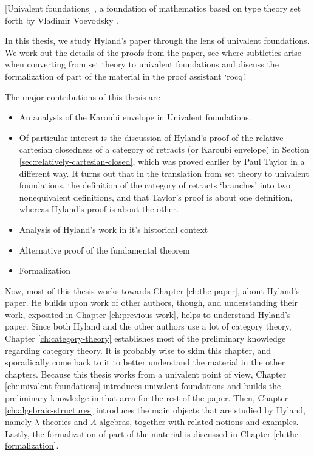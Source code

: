 
[Univalent foundations]
, a foundation of mathematics based on type theory set forth by Vladimir Voevodsky \autocite{voevodsky-univalent-foundations}.

In this thesis, we study Hyland's paper through the lens of univalent foundations. We work out the details of the proofs from the paper, see where subtleties arise when converting from set theory to univalent foundations and discuss the formalization of part of the material in the proof assistant `rocq'.

The major contributions of this thesis are
\begin{itemize}
  \item An analysis of the Karoubi envelope in Univalent foundations.
  \item Of particular interest is the discussion of Hyland's proof of the relative cartesian closedness of a category of retracts (or Karoubi envelope) in Section \ref{sec:relatively-cartesian-closed}, which was proved earlier by Paul Taylor in a different way. It turns out that in the translation from set theory to univalent foundations, the definition of the category of retracts `branches' into two nonequivalent definitions, and that Taylor's proof is about one definition, whereas Hyland's proof is about the other.
  \item Analysis of Hyland's work in it's historical context
  \item Alternative proof of the fundamental theorem
  \item Formalization
\end{itemize}

Now, most of this thesis works towards Chapter \ref{ch:the-paper}, about Hyland's paper.
He builds upon work of other authors, though, and understanding their work, exposited in Chapter \ref{ch:previous-work}, helps to understand Hyland's paper.
Since both Hyland and the other authors use a lot of category theory, Chapter \ref{ch:category-theory} establishes most of the preliminary knowledge regarding category theory. It is probably wise to skim this chapter, and sporadically come back to it to better understand the material in the other chapters.
Because this thesis works from a univalent point of view, Chapter \ref{ch:univalent-foundations} introduces univalent foundations and builds the preliminary knowledge in that area for the rest of the paper.
Then, Chapter \ref{ch:algebraic-structures} introduces the main objects that are studied by Hyland, namely $ \lambda $-theories and $ \Lambda $-algebras, together with related notions and examples.
Lastly, the formalization of part of the material is discussed in Chapter \ref{ch:the-formalization}.

